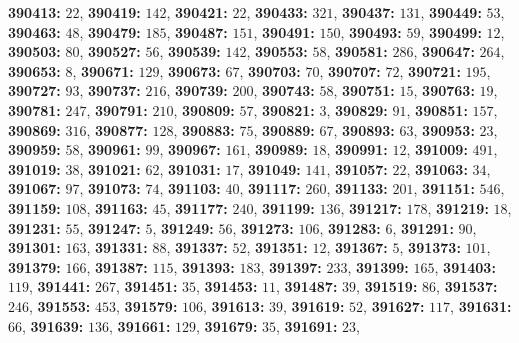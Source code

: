 \textsf{\bfseries 390413:} $22$, \textsf{\bfseries 390419:} $142$, \textsf{\bfseries 390421:} $22$, \textsf{\bfseries 390433:} $321$, \textsf{\bfseries 390437:} $131$, \textsf{\bfseries 390449:} $53$, \textsf{\bfseries 390463:} $48$, \textsf{\bfseries 390479:} $185$, \textsf{\bfseries 390487:} $151$, \textsf{\bfseries 390491:} $150$, \textsf{\bfseries 390493:} $59$, \textsf{\bfseries 390499:} $12$, \textsf{\bfseries 390503:} $80$, \textsf{\bfseries 390527:} $56$, \textsf{\bfseries 390539:} $142$, \textsf{\bfseries 390553:} $58$, \textsf{\bfseries 390581:} $286$, \textsf{\bfseries 390647:} $264$, \textsf{\bfseries 390653:} $8$, \textsf{\bfseries 390671:} $129$, \textsf{\bfseries 390673:} $67$, \textsf{\bfseries 390703:} $70$, \textsf{\bfseries 390707:} $72$, \textsf{\bfseries 390721:} $195$, \textsf{\bfseries 390727:} $93$, \textsf{\bfseries 390737:} $216$, \textsf{\bfseries 390739:} $200$, \textsf{\bfseries 390743:} $58$, \textsf{\bfseries 390751:} $15$, \textsf{\bfseries 390763:} $19$, \textsf{\bfseries 390781:} $247$, \textsf{\bfseries 390791:} $210$, \textsf{\bfseries 390809:} $57$, \textsf{\bfseries 390821:} $3$, \textsf{\bfseries 390829:} $91$, \textsf{\bfseries 390851:} $157$, \textsf{\bfseries 390869:} $316$, \textsf{\bfseries 390877:} $128$, \textsf{\bfseries 390883:} $75$, \textsf{\bfseries 390889:} $67$, \textsf{\bfseries 390893:} $63$, \textsf{\bfseries 390953:} $23$, \textsf{\bfseries 390959:} $58$, \textsf{\bfseries 390961:} $99$, \textsf{\bfseries 390967:} $161$, \textsf{\bfseries 390989:} $18$, \textsf{\bfseries 390991:} $12$, \textsf{\bfseries 391009:} $491$, \textsf{\bfseries 391019:} $38$, \textsf{\bfseries 391021:} $62$, \textsf{\bfseries 391031:} $17$, \textsf{\bfseries 391049:} $141$, \textsf{\bfseries 391057:} $22$, \textsf{\bfseries 391063:} $34$, \textsf{\bfseries 391067:} $97$, \textsf{\bfseries 391073:} $74$, \textsf{\bfseries 391103:} $40$, \textsf{\bfseries 391117:} $260$, \textsf{\bfseries 391133:} $201$, \textsf{\bfseries 391151:} $546$, \textsf{\bfseries 391159:} $108$, \textsf{\bfseries 391163:} $45$, \textsf{\bfseries 391177:} $240$, \textsf{\bfseries 391199:} $136$, \textsf{\bfseries 391217:} $178$, \textsf{\bfseries 391219:} $18$, \textsf{\bfseries 391231:} $55$, \textsf{\bfseries 391247:} $5$, \textsf{\bfseries 391249:} $56$, \textsf{\bfseries 391273:} $106$, \textsf{\bfseries 391283:} $6$, \textsf{\bfseries 391291:} $90$, \textsf{\bfseries 391301:} $163$, \textsf{\bfseries 391331:} $88$, \textsf{\bfseries 391337:} $52$, \textsf{\bfseries 391351:} $12$, \textsf{\bfseries 391367:} $5$, \textsf{\bfseries 391373:} $101$, \textsf{\bfseries 391379:} $166$, \textsf{\bfseries 391387:} $115$, \textsf{\bfseries 391393:} $183$, \textsf{\bfseries 391397:} $233$, \textsf{\bfseries 391399:} $165$, \textsf{\bfseries 391403:} $119$, \textsf{\bfseries 391441:} $267$, \textsf{\bfseries 391451:} $35$, \textsf{\bfseries 391453:} $11$, \textsf{\bfseries 391487:} $39$, \textsf{\bfseries 391519:} $86$, \textsf{\bfseries 391537:} $246$, \textsf{\bfseries 391553:} $453$, \textsf{\bfseries 391579:} $106$, \textsf{\bfseries 391613:} $39$, \textsf{\bfseries 391619:} $52$, \textsf{\bfseries 391627:} $117$, \textsf{\bfseries 391631:} $66$, \textsf{\bfseries 391639:} $136$, \textsf{\bfseries 391661:} $129$, \textsf{\bfseries 391679:} $35$, \textsf{\bfseries 391691:} $23$, 
